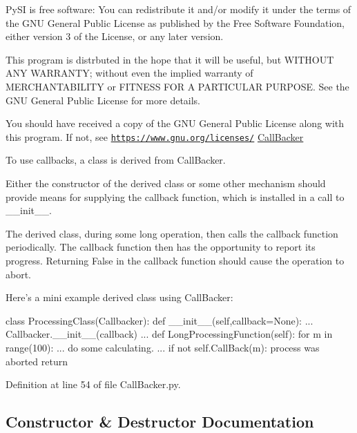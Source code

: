Py\+SI is free software\+: You can redistribute it and/or modify it under the terms of the G\+NU General Public License as published by the Free Software Foundation, either version 3 of the License, or any later version.

This program is distrbuted in the hope that it will be useful, but W\+I\+T\+H\+O\+UT A\+NY W\+A\+R\+R\+A\+N\+TY; without even the implied warranty of M\+E\+R\+C\+H\+A\+N\+T\+A\+B\+I\+L\+I\+TY or F\+I\+T\+N\+E\+SS F\+OR A P\+A\+R\+T\+I\+C\+U\+L\+AR P\+U\+R\+P\+O\+SE. See the G\+NU General Public License for more details.

You should have received a copy of the G\+NU General Public License along with this program. If not, see \href{https://www.gnu.org/licenses/}{\tt https\+://www.\+gnu.\+org/licenses/} \hyperlink{classSignalIntegrity_1_1CallBacker_1_1CallBacker}{Call\+Backer} \begin{DoxyVerb}To use callbacks, a class is derived from CallBacker.

Either the constructor of the derived class or some other mechanism should
provide means for supplying the callback function, which is installed in a
call to __init__.

The derived class, during some long operation, then calls the callback function
periodically.  The callback function then has the opportunity to report its
progress.  Returning False in the callback function should cause the operation
to abort.

Here's a mini example derived class using CallBacker:
\end{DoxyVerb}



\begin{DoxyCode}
\textcolor{keyword}{class }ProcessingClass(Callbacker):
    \textcolor{keyword}{def }\_\_init\_\_(self,callback=None):
        ...
        Callbacker.\_\_init\_\_(callback)
        ...
    \textcolor{keyword}{def }LongProcessingFunction(self):
        \textcolor{keywordflow}{for} m \textcolor{keywordflow}{in} range(100):
            ...
            do some calculating.
            ...
            \textcolor{keywordflow}{if} \textcolor{keywordflow}{not} self.CallBack(m):
                process was aborted
                \textcolor{keywordflow}{return}
\end{DoxyCode}
 

Definition at line 54 of file Call\+Backer.\+py.



\subsection{Constructor \& Destructor Documentation}
\mbox{\label{classSignalIntegrity_1_1CallBacker_1_1CallBacker_a5580a7fcf0bfd317a8f8c7c80eefdd69}} 
